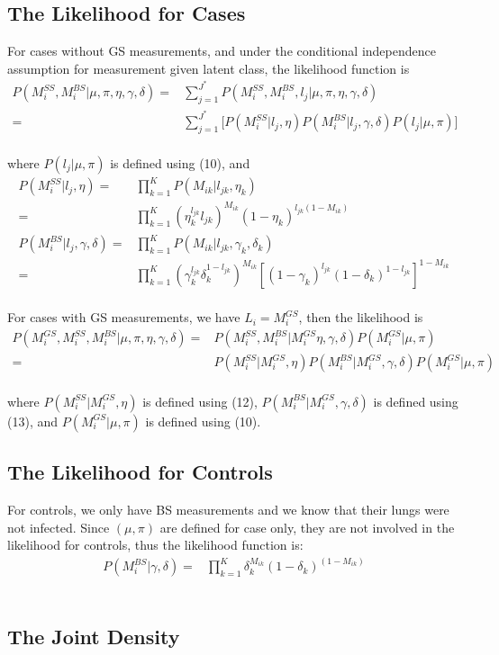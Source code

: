 \documentclass[11 pt, a4paper]{article}  %
\begin{document}
\subsection{The Likelihood for Cases}
For cases without GS measurements, and under the conditional independence assumption for measurement given latent class, the likelihood function is
\begin{align*}
 P(M_i^{SS},M_i^{BS} | \mu, \pi, \eta, \gamma, \delta) 
 = & \sum_{j = 1}^{J^*}  P(M_i^{SS},M_i^{BS}, l_j | \mu, \pi, \eta, \gamma, \delta)  \\ 
= & \sum_{j = 1}^{J^*} \big[ P(M_i^{SS} | l_j, \eta) P(M_i^{BS} | l_j, \gamma, \delta) P(l_j | \mu, \pi) \big ] 
\end{align*}
\\
where $P(l_j | \mu, \pi)$ is defined using (10), and
\begin{align}
P(M_i^{SS} | l_j, \eta) = & \prod_{k=1}^K P(M_{ik} | l_{jk}, \eta_k) \nonumber \\
 = & \prod_{k=1}^K (\eta_k^{l_{jk}}l_{jk})^{M_{ik}} (1-\eta_k)^{l_{jk}(1-M_{ik})}\\
P(M_i^{BS} | l_j, \gamma, \delta) = & \prod_{k=1}^K P(M_{ik} | l_{jk}, \gamma_k, \delta_k) \nonumber \\
 = & \prod_{k=1}^K (\gamma_k^{l_{jk}} \delta_k^{1-l_{jk}})^{M_{ik}} [(1-\gamma_k)^{l_{jk}} (1-\delta_k)^{1-l_{jk}}]^{1-M_{ik}}
\end{align}
\\
For cases with GS measurements, we have $L_i = M_i^{GS}$, then the likelihood is 
\begin{align*}
 P(M_i^{GS},M_i^{SS},M_i^{BS} | \mu, \pi, \eta, \gamma, \delta) 
= & P(M_i^{SS},M_i^{BS} | M_i^{GS} \eta, \gamma, \delta) P(M_i^{GS} | \mu, \pi)\\
= & P(M_i^{SS}| M_i^{GS}, \eta) P(M_i^{BS} | M_i^{GS}, \gamma, \delta) P(M_i^{GS} | \mu, \pi)
\end{align*}
\\
where $P(M_i^{SS}| M_i^{GS}, \eta)$ is defined using (12), $P(M_i^{BS} | M_i^{GS}, \gamma, \delta)$ is defined using (13), and $P(M_i^{GS} | \mu, \pi)$ is defined using (10).\\

\subsection{The Likelihood for Controls}
For controls, we only have BS measurements and we know that their lungs were not infected. Since $(\mu, \pi)$ are defined for case only, they are not involved in the likelihood for controls, thus the likelihood function is:
\begin{align*}
 P(M_i^{BS} |\gamma, \delta) = & \prod_{k=1}^K \delta_k^{M_{ik}}(1-\delta_k)^{(1-M_{ik})}
\end{align*}
\\



\subsection{The Joint Density}
\end{document}
